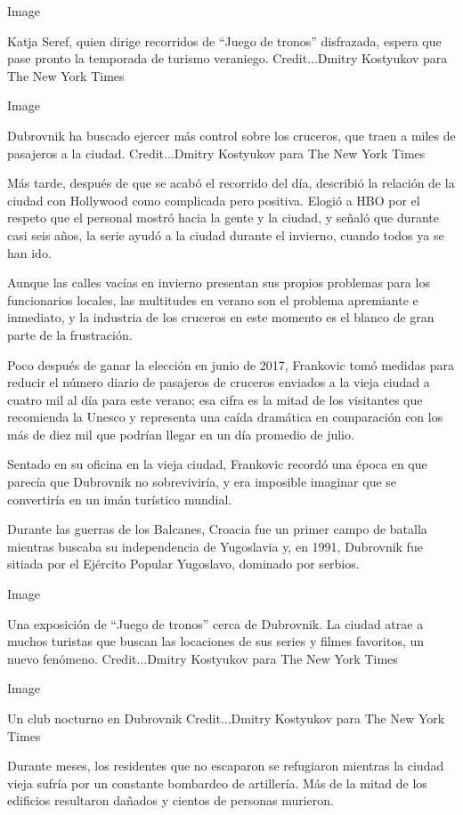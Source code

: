 Image

Katja Seref, quien dirige recorridos de ``Juego de tronos'' disfrazada,
espera que pase pronto la temporada de turismo veraniego.
Credit...Dmitry Kostyukov para The New York Times

Image

Dubrovnik ha buscado ejercer más control sobre los cruceros, que traen a
miles de pasajeros a la ciudad. Credit...Dmitry Kostyukov para The New
York Times

Más tarde, después de que se acabó el recorrido del día, describió la
relación de la ciudad con Hollywood como complicada pero positiva.
Elogió a HBO por el respeto que el personal mostró hacia la gente y la
ciudad, y señaló que durante casi seis años, la serie ayudó a la ciudad
durante el invierno, cuando todos ya se han ido.

Aunque las calles vacías en invierno presentan sus propios problemas
para los funcionarios locales, las multitudes en verano son el problema
apremiante e inmediato, y la industria de los cruceros en este momento
es el blanco de gran parte de la frustración.

Poco después de ganar la elección en junio de 2017, Frankovic tomó
medidas para reducir el número diario de pasajeros de cruceros enviados
a la vieja ciudad a cuatro mil al día para este verano; esa cifra es la
mitad de los visitantes que recomienda la Unesco y representa una caída
dramática en comparación con los más de diez mil que podrían llegar en
un día promedio de julio.

Sentado en su oficina en la vieja ciudad, Frankovic recordó una época en
que parecía que Dubrovnik no sobreviviría, y era imposible imaginar que
se convertiría en un imán turístico mundial.

Durante las guerras de los Balcanes, Croacia fue un primer campo de
batalla mientras buscaba su independencia de Yugoslavia y, en 1991,
Dubrovnik fue sitiada por el Ejército Popular Yugoslavo, dominado por
serbios.

Image

Una exposición de ``Juego de tronos'' cerca de Dubrovnik. La ciudad
atrae a muchos turistas que buscan las locaciones de sus series y filmes
favoritos, un nuevo fenómeno. Credit...Dmitry Kostyukov para The New
York Times

Image

Un club nocturno en Dubrovnik Credit...Dmitry Kostyukov para The New
York Times

Durante meses, los residentes que no escaparon se refugiaron mientras la
ciudad vieja sufría por un constante bombardeo de artillería. Más de la
mitad de los edificios resultaron dañados y cientos de personas
murieron.

